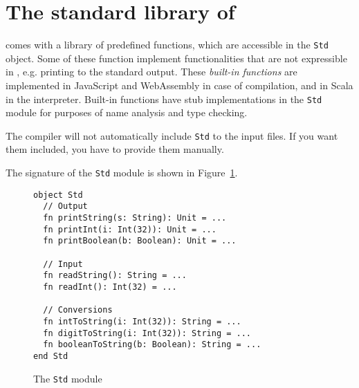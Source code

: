 \section{The standard library of \langname}

\langname comes with a library of predefined functions,
which are accessible in the \lstinline{Std} object.
Some of these function implement functionalities
that are not expressible in \langname,
e.g. printing to the standard output.
These \emph{built-in functions} are implemented in JavaScript and \hbox{WebAssembly} in case of compilation,
and in Scala in the interpreter.
Built-in functions have stub implementations in the \langname \lstinline{Std} module
for purposes of name analysis and type checking.

The \langname compiler will not automatically include \lstinline{Std} to the input files.
If you want them included, you have to provide them manually.

The signature of the \lstinline{Std} module is shown in Figure~\ref{fig:std}.

\begin{figure}
\begin{lstlisting}
object Std 
  // Output
  fn printString(s: String): Unit = ...
  fn printInt(i: Int(32)): Unit = ...
  fn printBoolean(b: Boolean): Unit = ...

  // Input
  fn readString(): String = ...
  fn readInt(): Int(32) = ...

  // Conversions
  fn intToString(i: Int(32)): String = ...
  fn digitToString(i: Int(32)): String = ...
  fn booleanToString(b: Boolean): String = ...
end Std
\end{lstlisting}
\caption{The \lstinline{Std} module}
    \label{fig:std}
\end{figure}
